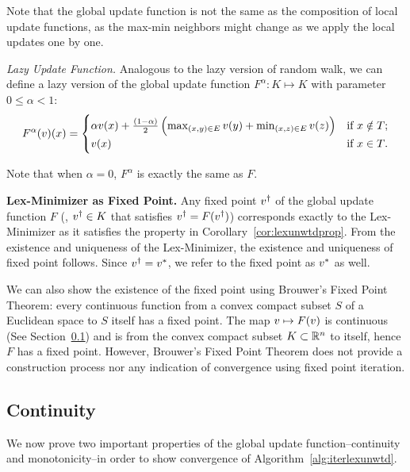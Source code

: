 \documentclass[12pt]{amsart}
\begin{document}
Note that the global update function is not the same as the composition of local update functions, as the max-min neighbors might change as we apply the local updates one by one.

\textit{Lazy Update Function.}
Analogous to the lazy version of random walk, we can define a lazy version of the global update function $F^\alpha: K\mapsto K$ with parameter $0 \leq \alpha < 1$:
\begin{equation*}
F^\alpha(v)(x) =  \begin{cases}
\alpha v(x) + \frac{\left({1-\alpha}\right)}{2}\left({\max_{(x,y)\in E}v(y)+\min_{(x,z)\in E}v(z)}\right) &\text{if $x\notin T$;} \\
v(x) &\text{if $x\in T$.}
\end{cases}
\end{equation*}

Note that when $\alpha=0$, $F^\alpha$ is exactly the same as $F$.

\textbf{Lex-Minimizer as Fixed Point.}
Any fixed point $v^\dagger$ of the global update function $F$ (\ie, $v^\dagger\in K$ that satisfies $v^\dagger = F(v^\dagger)$) corresponds exactly to the Lex-Minimizer as it satisfies the property in Corollary~\ref{cor:lexunwtdprop}. From the existence and uniqueness of the Lex-Minimizer, the existence and uniqueness of fixed point follows. Since $v^\dagger = v^*$, we refer to the fixed point as $v^*$ as well.

We can also show the existence of the fixed point using Brouwer's Fixed Point Theorem: every continuous function from a convex compact subset $S$ of a Euclidean space to $S$ itself has a fixed point. The map $v\mapsto F(v)$ is continuous (See Section~\ref{sec:continuity}) and is from the convex compact subset $K\subset \mathbb R^n$ to itself, hence $F$ has a fixed point. However, Brouwer's Fixed Point Theorem does not provide a construction process nor any indication of convergence using fixed point iteration.

\subsection{Continuity}\label{sec:continuity}
We now prove two important properties of the global update function--continuity and monotonicity--in order to show convergence of Algorithm~\ref{alg:iterlexunwtd}.
\end{document}
